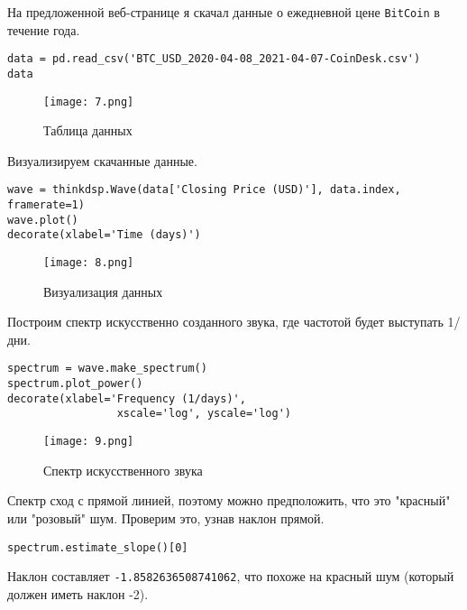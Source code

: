 \documentclass[a4paper,12pt]{report}
\begin{document}
На предложенной веб-странице я скачал данные о ежедневной цене \texttt{BitCoin} в течение года.

\begin{lstlisting}[caption=Таблица данных]
data = pd.read_csv('BTC_USD_2020-04-08_2021-04-07-CoinDesk.csv')
data
\end{lstlisting}

\begin{figure}[H]
        \centering
        \texttt{[image: 7.png]}
        \caption{Таблица данных}
        \label{fig:lab4_fig3_1}
\end{figure}

Визуализируем скачанные данные.

\begin{lstlisting}[caption=Визуализация данных]
wave = thinkdsp.Wave(data['Closing Price (USD)'], data.index, framerate=1)
wave.plot()
decorate(xlabel='Time (days)')
\end{lstlisting}

\begin{figure}[H]
        \centering
        \texttt{[image: 8.png]}
        \caption{Визуализация данных}
        \label{fig:lab4_fig3_2}
\end{figure}

Построим спектр искусственно созданного звука, где частотой будет выступать 1/дни.

\begin{lstlisting}[caption=Спектр искусственного звука]
spectrum = wave.make_spectrum()
spectrum.plot_power()
decorate(xlabel='Frequency (1/days)',
                 xscale='log', yscale='log')
\end{lstlisting}

\begin{figure}[H]
        \centering
        \texttt{[image: 9.png]}
        \caption{Спектр искусственного звука}
        \label{fig:lab4_fig3_3}
\end{figure}

Спектр сход с прямой линией, поэтому можно предположить, что это "красный" или "розовый" шум. Проверим это, узнав наклон прямой.

\begin{lstlisting}[caption=Наклон прямой]
spectrum.estimate_slope()[0]
\end{lstlisting}

Наклон составляет \texttt{-1.8582636508741062}, что похоже на красный шум (который должен иметь наклон -2).
\end{document}
